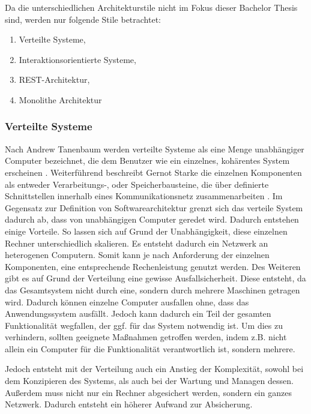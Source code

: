 Da die unterschiedlichen Architekturstile nicht im  Fokus dieser Bachelor Thesis sind, werden nur folgende Stile betrachtet:

\begin{enumerate}
	\item Verteilte Systeme,
	\item Interaktionsorientierte Systeme,
	\item REST-Architektur,
	\item Monolithe Architektur
\end{enumerate}


\subsubsection{Verteilte Systeme}

Nach Andrew Tanenbaum werden verteilte Systeme als eine Menge unabhängiger Computer bezeichnet, die dem Benutzer wie ein einzelnes, kohärentes System erscheinen \parencite{tanenbaum_verteilte_2007}. Weiterführend beschreibt Gernot Starke die einzelnen Komponenten als entweder Verarbeitungs-, oder Speicherbausteine, die über definierte Schnittstellen innerhalb eines Kommunikationsnetz zusammenarbeiten \parencite[vlg.][S. 116]{starke_effektive_2015}. Im Gegensatz zur Definition von Softwarearchitektur grenzt sich das verteile System dadurch ab, dass von unabhängigen Computer geredet wird. Dadurch entstehen einige Vorteile. So lassen sich auf Grund der Unabhängigkeit, diese einzelnen Rechner unterschiedlich skalieren. Es entsteht dadurch ein Netzwerk an heterogenen Computern. Somit kann je nach Anforderung der einzelnen Komponenten, eine entsprechende Rechenleistung genutzt werden. Des Weiteren gibt es auf Grund der Verteilung eine gewisse Ausfallsicherheit. Diese entsteht, da das Gesamtsystem nicht durch eine, sondern durch mehrere Maschinen getragen wird. Dadurch können einzelne Computer ausfallen ohne, dass das Anwendungssystem ausfällt. Jedoch kann dadurch ein Teil der gesamten Funktionalität wegfallen, der ggf. für das System notwendig ist. Um dies zu verhindern, sollten geeignete Maßnahmen getroffen werden, indem z.B. nicht allein ein Computer für die Funktionalität verantwortlich ist, sondern mehrere.

Jedoch entsteht mit der Verteilung auch ein Anstieg der Komplexität, sowohl bei dem Konzipieren des Systems, als auch bei der Wartung und Managen dessen. Außerdem muss nicht nur ein Rechner abgesichert werden, sondern ein ganzes Netzwerk. Dadurch entsteht ein höherer Aufwand zur Absicherung.

